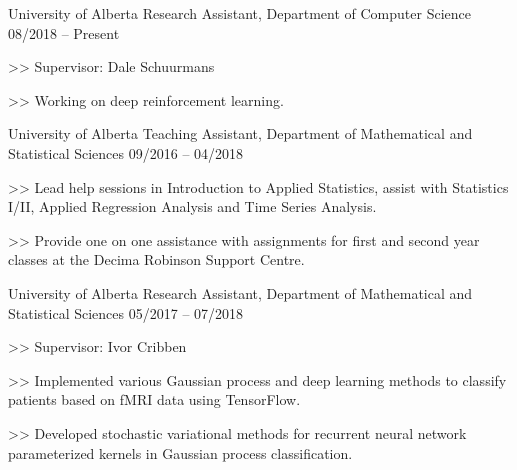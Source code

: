 \begin{cventries}
\cventry
    {University of Alberta}
    {Research Assistant, Department of Computer Science}
    {08/2018 -- Present}
    {
      \begin{cvitems}
      \item[>>] Supervisor: Dale Schuurmans 
      \item[>>] Working on deep reinforcement learning.
      \end{cvitems}
    }


  \cventry
    {University of Alberta}
    {Teaching Assistant, Department of Mathematical and Statistical Sciences} {09/2016 -- 04/2018}
    {
      \begin{cvitems}
        \item[>>] Lead help sessions in Introduction to Applied Statistics, assist with Statistics I/II, Applied Regression Analysis and Time Series Analysis.
        \item[>>] Provide one on one assistance with assignments for first and second year classes at the Decima Robinson Support Centre.
      \end{cvitems}
    }
\cventry
    {University of Alberta}
    {Research Assistant, Department of Mathematical and Statistical Sciences}    {05/2017 -- 07/2018}
    {
      \begin{cvitems}
        \item[>>] Supervisor: Ivor Cribben
        \item[>>] Implemented various Gaussian process and deep learning methods to classify patients based on fMRI data using TensorFlow.
        \item[>>] Developed stochastic variational methods for recurrent neural network parameterized kernels in Gaussian process classification.
      \end{cvitems}
    }

\end{cventries}
